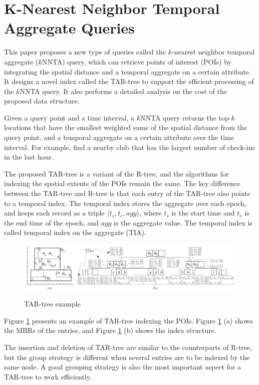 \documentclass[paper=a4, fontsize=18pt]{article} %
\numberwithin{equation}{section} %
\numberwithin{figure}{section} %
\numberwithin{table}{section} %
\begin{document}
\section{K-Nearest Neighbor Temporal Aggregate Queries \cite{SQZ015}}

This paper proposes a new type of queries called the $k$-nearest neighbor temporal aggregate ($k$NNTA) query, which can retrieve points of interest (POIs) by integrating the spatial distance and a temporal aggregate on a certain attribute. It designs a novel index called the TAR-tree to support the efficient processing of the $k$NNTA query. It also performs a detailed analysis on the cost of the proposed data structure.

Given a query point and a time interval, a $k$NNTA query returns the top-$k$ locations that have the smallest weighted sums of the spatial distance from the query point, and a temporal aggregate on a certain attribute over the time interval. For example, find a nearby club that has the largest number of check-ins in the last hour.

The proposed TAR-tree is a variant of the R-tree, and the algorithms for indexing the spatial extents of the POIs remain the same. The key difference between the TAR-tree and R-tree is that each entry of the TAR-tree also points to a temporal index. The temporal index stores the aggregate over each epoch, and keeps each record as a triple $\langle t_s, t_e, agg \rangle$, where $t_s$ is the start time and $t_e$ is the end time of the epoch, and $agg$ is the aggregate value. The temporal index is called temporal index on the aggregate (TIA).

\begin{figure}[h]
  \centering
  \includegraphics[width=.9\linewidth]{8_15_TAR.png}\\
  \caption{TAR-tree example}\label{fig:TAR}
\end{figure}

Figure \ref{fig:TAR} presents an example of TAR-tree indexing the POIs. Figure \ref{fig:TAR} (a) shows the MBRs of the entries, and Figure \ref{fig:TAR} (b) shows the index structure.

The insertion and deletion of TAR-tree are similar to the counterparts of R-tree, but the group strategy is different when several entries are to be indexed by the same node. A good grouping strategy is also the most important aspect for a TAR-tree to work efficiently.
\end{document}
